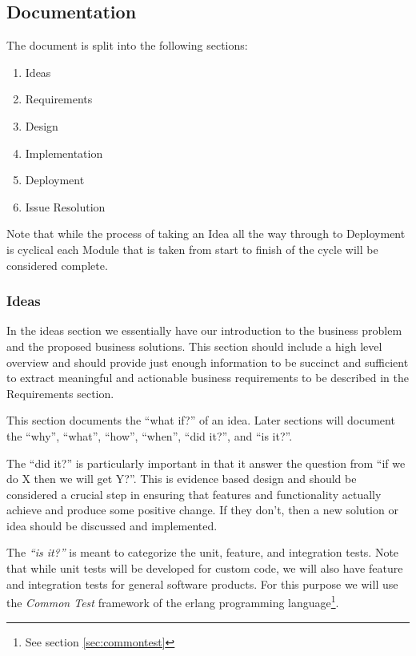 \subsection{Documentation}

The document is split into the following sections:

\begin{enumerate}
    \item Ideas
    \item Requirements
    \item Design
    \item Implementation
    \item Deployment
    \item Issue Resolution
\end{enumerate}

Note that while the process of taking an Idea all the way through to Deployment
is cyclical each Module that is taken from start to finish of the cycle will be
considered complete.

\subsubsection{Ideas}

In the ideas section we essentially have our introduction to the business problem
and the proposed business solutions.  This section should include a high level 
overview and should provide just enough information to be succinct and sufficient
to extract meaningful and actionable business requirements to be described in the
Requirements section.

This section documents the ``what if?'' of an idea.  Later sections will document
the ``why'', ``what'', ``how'', ``when'', ``did it?'', and ``is it?''.

The ``did it?'' is particularly important in that it answer the question from 
``if we do X then we will get Y?''.  This is evidence based design and should
be considered a crucial step in ensuring that features and functionality actually
achieve and produce some positive change.  If they don't, then a new solution
or idea should be discussed and implemented.

The \emph{``is it?''} is meant to categorize the unit, feature, and integration 
tests.  Note that while unit tests will be developed for custom code, we will also
have feature and integration tests for general software products.  For this 
purpose we will use the \emph{Common Test} framework of the erlang programming
language\footnote{See section \ref{sec:commontest}}.

